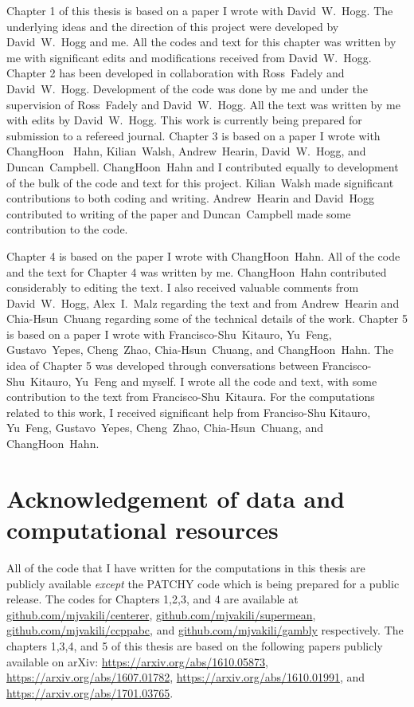 Chapter 1 of this thesis is based on a paper I wrote with David~W.~Hogg. The underlying ideas and the direction of this project were developed by David~W.~Hogg and me. 
All the codes and text for this chapter was written by me with significant edits and modifications received from David~W.~Hogg. Chapter 2 has been developed in collaboration with Ross~Fadely and David~W.~Hogg. Development of the code was done by me and under the supervision of Ross~Fadely and David~W.~Hogg. All the text was written by me with edits by David~W.~Hogg. This work is currently being prepared for submission to a refereed journal.
Chapter 3 is based on a paper I wrote with ChangHoon~ Hahn, Kilian~Walsh, Andrew~Hearin, David~W.~Hogg, and Duncan~Campbell. ChangHoon~Hahn and I contributed equally to development of the bulk of the code and text for this project. Kilian~Walsh made significant contributions to both coding and writing. Andrew~Hearin and David~Hogg contributed to writing of the paper and Duncan~Campbell made some contribution 
to the code. 

Chapter 4 is based on the paper I wrote with ChangHoon~Hahn. All of the code and the text for Chapter 4 was written by me. ChangHoon~Hahn contributed considerably to editing the text. I also received valuable comments from David~W.~Hogg, Alex~I.~Malz regarding the text and from Andrew~Hearin and Chia-Hsun~Chuang regarding some of the technical details of the work. Chapter 5 is based on a paper I wrote with Francisco-Shu~Kitauro, Yu~Feng, Gustavo~Yepes, Cheng~Zhao, Chia-Hsun~Chuang, and ChangHoon~Hahn. 
The idea of Chapter 5 was developed through conversations between Francisco-Shu~Kitauro, Yu~Feng and myself. I wrote all the code and text, with some contribution to the text from Francisco-Shu~Kitaura. For the computations related to this work, I received significant help from Franciso-Shu Kitauro, Yu~Feng, Gustavo~Yepes, Cheng~Zhao, Chia-Hsun~Chuang, and ChangHoon~Hahn. 

\section{Acknowledgement of data and computational resources}

All of the code that I have written for the computations in this thesis are publicly available \emph{except} the PATCHY code which is being prepared for a public release. 
The codes for Chapters 1,2,3, and 4 are available at \url{github.com/mjvakili/centerer}, \url{github.com/mjvakili/supermean}, \url{github.com/mjvakili/ccppabc}, and \url{github.com/mjvakili/gambly} respectively. The chapters 1,3,4, and 5 of this thesis are based on the following papers publicly available on arXiv: \url{https://arxiv.org/abs/1610.05873}, \url{https://arxiv.org/abs/1607.01782}, \url{https://arxiv.org/abs/1610.01991}, and \url{https://arxiv.org/abs/1701.03765}.

